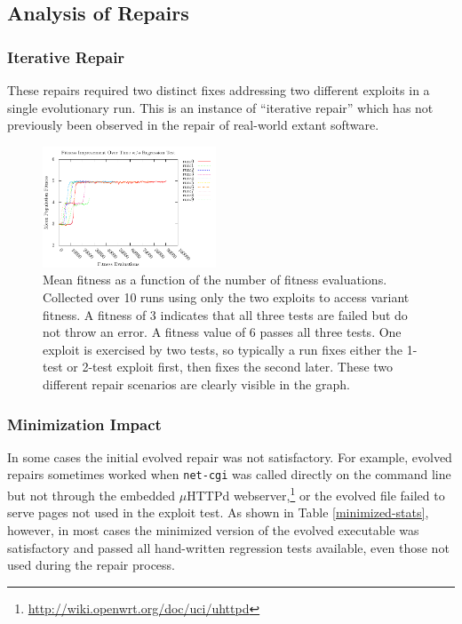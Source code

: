 \documentclass{sigcomm-alternate}
\begin{document}
\subsection{Analysis of Repairs}
\label{sec-4-2}

\subsubsection{Iterative Repair}
\label{sec-4-2-1}
These repairs required two distinct fixes addressing two different
exploits in a single evolutionary run.  This is an instance of
``iterative repair'' which has not previously been observed in the
repair of real-world extant software.

\begin{figure}[htb]
  \centering
  \includegraphics[bb=0 0 355 248,width=0.46\textwidth]{fitness-improvement.pdf}
  \caption{Mean fitness as a function of the number of fitness
    evaluations.  Collected over 10 runs using only the two exploits
    to access variant fitness.  A fitness of 3 indicates that all
    three tests are failed but do not throw an error.  A fitness value
    of 6 passes all three tests.  One exploit is exercised by two
    tests, so typically a run fixes either the 1-test or 2-test
    exploit first, then fixes the second later.  These two different
    repair scenarios are clearly visible in the graph.}
  \label{fit-by-time}
\end{figure}

\subsubsection{Minimization Impact}
\label{minimization}

In some cases the initial evolved repair was not satisfactory.  For
example, evolved repairs sometimes worked when \texttt{net-cgi} was
called directly on the command line but not through the embedded
$\mu$HTTPd webserver,\footnote{\url{http://wiki.openwrt.org/doc/uci/uhttpd}}
or the evolved file failed to serve pages not used in the
exploit test.  As shown in Table \ref{minimized-stats}, however, in most
cases the minimized version of the evolved executable was satisfactory
and passed all hand-written regression tests available, even those not used
during the repair process. 
\end{document}
